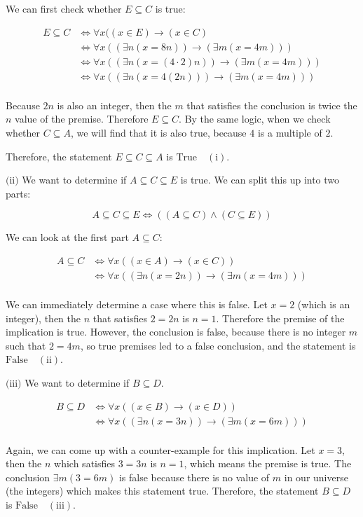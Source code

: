 \documentclass{article}
\newcommand{\T}{\text{True}}
\newcommand{\F}{\text{False}}
\newcommand{\subproblem}[1]{$\boxed{\text{(#1)}}$}
\newcommand{\subsolution}[2]{\boxed{#2\quad(\text{#1})}}
\newcommand{\multistep}[1]{\begin{array}{rl} #1 \end{array}}
\newcommand{\subeq}{\subseteq}
\begin{document}
\begin{multicols*}{2}
We can first check whether $E\subseteq{}C$ is true:

\[
\multistep{
E\subseteq{}C&\Leftrightarrow \forall x((x\in E)\rightarrow(x\in C) \\
&\Leftrightarrow \forall x((\exists n(x=8n))\rightarrow(\exists m(x=4m))) \\
&\Leftrightarrow \forall x((\exists n(x=(4\cdot2)n))\rightarrow(\exists m(x=4m))) \\
&\Leftrightarrow \forall x((\exists n(x=4(2n)))\rightarrow(\exists m(x=4m))) \\
}
\]

Because $2n$ is also an integer, then the $m$ that satisfies the
conclusion is twice the $n$ value of the premise. Therefore
$E\subseteq{}C$. By the same logic, when we check whether
$C\subseteq{}A$, we will find that it is also true, because $4$ is a
multiple of $2$.

Therefore, the statement $E\subseteq{}C\subseteq{}A$ is $\subsolution{i}{\T}$.

%
\subproblem{ii} We want to determine if $A\subeq{}C\subeq{}E$ is
true. We can split this up into two parts:

\[
A\subeq{}C\subeq{}E\Leftrightarrow((A\subeq C)\wedge(C\subeq E))
\]

We can look at the first part $A\subeq{}C$:

\[
\multistep{
A\subeq{}C&\Leftrightarrow \forall x((x\in A)\rightarrow(x\in C)) \\
&\Leftrightarrow \forall x((\exists n(x=2n))\rightarrow(\exists m(x=4m))) \\
}
\]

We can immediately determine a case where this is false. Let $x=2$
(which is an integer), then the $n$ that satisfies $2=2n$ is
$n=1$. Therefore the premise of the implication is true. However, the
conclusion is false, because there is no integer $m$ such that $2=4m$,
so true premises led to a false conclusion, and the statement is
$\subsolution{ii}{\F}$.

%
\subproblem{iii} We want to determine if $B\subeq{}D$.

\[
\multistep{
B\subeq D&\Leftrightarrow \forall x((x\in B)\rightarrow(x\in D)) \\
&\Leftrightarrow \forall x((\exists n(x=3n))\rightarrow(\exists m(x=6m))) \\
}
\]

Again, we can come up with a counter-example for this implication. Let
$x=3$, then the $n$ which satisfies $3=3n$ is $n=1$, which means the
premise is true. The conclusion $\exists m(3=6m)$ is false because
there is no value of $m$ in our universe (the integers) which makes
this statement true. Therefore, the statement $B\subeq{}D$ is
$\subsolution{iii}{\F}$.


\end{multicols*}
\end{document}
